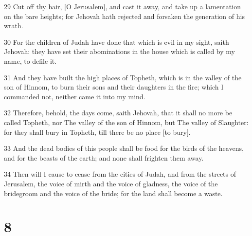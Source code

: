 \par 29 Cut off thy hair, [O Jerusalem], and cast it away, and take up a lamentation on the bare heights; for Jehovah hath rejected and forsaken the generation of his wrath.
\par 30 For the children of Judah have done that which is evil in my sight, saith Jehovah: they have set their abominations in the house which is called by my name, to defile it.
\par 31 And they have built the high places of Topheth, which is in the valley of the son of Hinnom, to burn their sons and their daughters in the fire; which I commanded not, neither came it into my mind.
\par 32 Therefore, behold, the days come, saith Jehovah, that it shall no more be called Topheth, nor The valley of the son of Hinnom, but The valley of Slaughter: for they shall bury in Topheth, till there be no place [to bury].
\par 33 And the dead bodies of this people shall be food for the birds of the heavens, and for the beasts of the earth; and none shall frighten them away.
\par 34 Then will I cause to cease from the cities of Judah, and from the streets of Jerusalem, the voice of mirth and the voice of gladness, the voice of the bridegroom and the voice of the bride; for the land shall become a waste.

\chapter{8}

